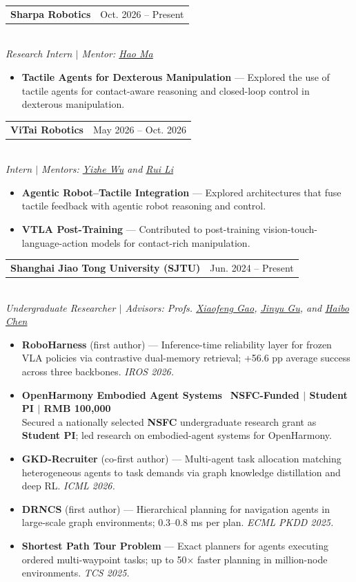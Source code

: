 \documentclass[a4paper,11pt]{article}
\makeatletter
\newcommand{\datedline}[2]{%
  \begin{tabularx}{\textwidth}{@{}>{\raggedright\arraybackslash}X>{\raggedleft\arraybackslash}p{0.34\textwidth}@{}}
    #1 & #2
  \end{tabularx}%
}
\newcommand{\experience}[3]{%
  \par\noindent
  \datedline{\textbf{#1}}{#2}\\[-1pt]
  {\small\textit{#3}}\vspace{1pt}
}
\newcommand{\advisor}[2]{\href{#1}{#2}}
\newcommand{\nsfctag}{%
  \colorbox{accent!10}{\textcolor{accent}{\footnotesize\faFlask\ \textbf{NSFC-Funded $\vert$ Student PI $\vert$ RMB 100,000}}}%
}
\makeatother
\begin{document}
\experience{Sharpa Robotics}{Oct. 2026 -- Present}
{Research Intern $\vert$ Mentor: \advisor{https://haomafrlu.github.io/}{Hao Ma}}
\begin{itemize}
  \item \textbf{Tactile Agents for Dexterous Manipulation} --- Explored the use of tactile agents for
  contact-aware reasoning and closed-loop control in dexterous manipulation.
\end{itemize}

\experience{ViTai Robotics}{May 2026 -- Oct. 2026}
{Intern $\vert$ Mentors: \advisor{https://ori.ox.ac.uk/people/yizhe-wu/}{Yizhe Wu} and \advisor{https://vit.ai/}{Rui Li}}
\begin{itemize}
  \item \textbf{Agentic Robot--Tactile Integration} --- Explored architectures that fuse tactile feedback
  with agentic robot reasoning and control.
  \item \textbf{VTLA Post-Training} --- Contributed to post-training vision-touch-language-action models
  for contact-rich manipulation.
\end{itemize}

\experience{Shanghai Jiao Tong University (SJTU)}{Jun. 2024 -- Present}
{Undergraduate Researcher $\vert$ Advisors: Profs. \advisor{https://www.cs.sjtu.edu.cn/~gao-xf/}{Xiaofeng Gao}, \advisor{https://ipads.sjtu.edu.cn/pub/members/jinyu_gu}{Jinyu Gu}, and \advisor{https://ipads.sjtu.edu.cn/pub/members/haibo_chen}{Haibo Chen}}
\begin{itemize}
  \item \textbf{RoboHarness} (first author) --- Inference-time reliability layer for frozen VLA policies via
  contrastive dual-memory retrieval; +56.6 pp average success across three backbones. \textit{IROS 2026.}
  \item \textbf{OpenHarmony Embodied Agent Systems} \nsfctag\\[1pt]
  Secured a nationally selected \textbf{NSFC} undergraduate research grant as \textbf{Student PI}; led research on
  embodied-agent systems for OpenHarmony.
  \item \textbf{GKD-Recruiter} (co-first author) --- Multi-agent task allocation matching heterogeneous agents
  to task demands via graph knowledge distillation and deep RL. \textit{ICML 2026.}
  \item \textbf{DRNCS} (first author) --- Hierarchical planning for navigation agents in large-scale graph
  environments; 0.3--0.8 ms per plan. \textit{ECML PKDD 2025.}
  \item \textbf{Shortest Path Tour Problem} --- Exact planners for agents executing ordered multi-waypoint
  tasks; up to 50$\times$ faster planning in million-node environments. \textit{TCS 2025.}
\end{itemize}
\end{document}
